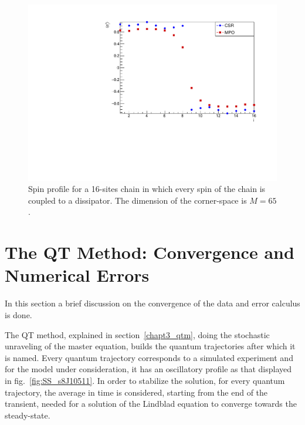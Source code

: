 \begin{figure}[H]
    \centering
    \includegraphics[scale=0.7]{Figures/8U8D_comparisonCSRvsMPO.pdf}
    \captionsetup{width=1.\linewidth}
    \caption{Spin profile for a 16-sites chain in which every spin of the chain is coupled to a dissipator. The dimension of the corner-space is $M=65$.}
    \label{fig:LMComparison16s1051}
\end{figure}

\section{The QT Method: Convergence and Numerical Errors}

In this section a brief discussion on the convergence of the data and error calculus is done. 

The QT method, explained in section~\ref{chapt3_qtm}, doing the stochastic unraveling of the master equation, builds the quantum trajectories after which it is named.  Every quantum trajectory corresponds to a simulated experiment and for the model under consideration, it has an oscillatory profile as that displayed in fig.~\ref{fig:SS_s8J10511}. In order to stabilize the solution, for every quantum trajectory, the average in time is considered, starting from the end of the transient, needed for a solution of the Lindblad equation to converge towards the steady-state.

